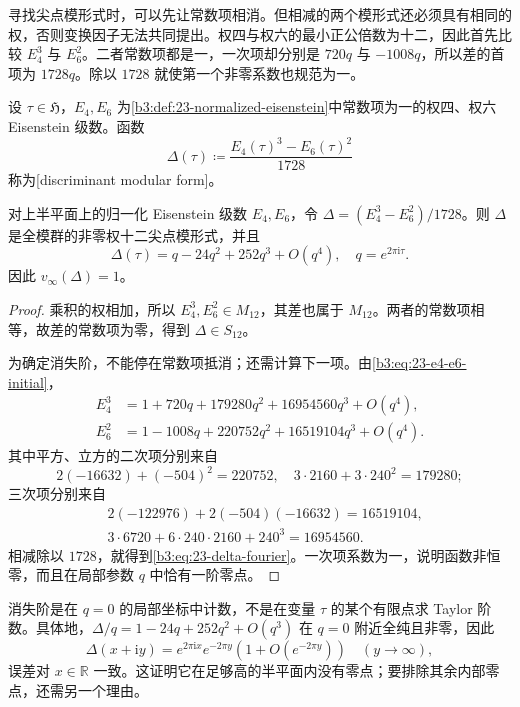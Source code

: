 寻找尖点模形式时，可以先让常数项相消。但相减的两个模形式还必须具有相同的权，否则变换因子无法共同提出。权四与权六的最小正公倍数为十二，因此首先比较 \(E_4^3\) 与 \(E_6^2\)。二者常数项都是一，一次项却分别是 \(720q\) 与 \(-1008q\)，所以差的首项为 \(1728q\)。除以 \(1728\) 就使第一个非零系数也规范为一。

\begin{definition}[判别式模形式]\label{b3:def:23-delta}
设 \(\tau\in\mathfrak H\)，\(E_4,E_6\) 为\cref{b3:def:23-normalized-eisenstein}中常数项为一的权四、权六 Eisenstein 级数。函数
\[
 \Delta(\tau)\coloneqq
 \frac{E_4(\tau)^3-E_6(\tau)^2}{1728}
\]
称为[discriminant modular form]。
\end{definition}

\begin{proposition}[判别式的权与尖点阶数]\label{b3:prop:23-delta-cusp}
对上半平面上的归一化 Eisenstein 级数 \(E_4,E_6\)，令 \(\Delta=(E_4^3-E_6^2)/1728\)。则 \(\Delta\) 是全模群的非零权十二尖点模形式，并且
\begin{equation}\label{b3:eq:23-delta-fourier}
 \Delta(\tau)=q-24q^2+252q^3+O(q^4),
 \quad q=e^{2\pi\mathrm{i}\tau}.
\end{equation}
因此 \(v_\infty(\Delta)=1\)。
\end{proposition}
\begin{proof}
乘积的权相加，所以 \(E_4^3,E_6^2\in M_{12}\)，其差也属于 \(M_{12}\)。两者的常数项相等，故差的常数项为零，得到 \(\Delta\in S_{12}\)。

为确定消失阶，不能停在常数项抵消；还需计算下一项。由\eqref{b3:eq:23-e4-e6-initial}，
\[
 \begin{aligned}
 E_4^3&=1+720q+179280q^2+16954560q^3+O(q^4),\\
 E_6^2&=1-1008q+220752q^2+16519104q^3+O(q^4).
 \end{aligned}
\]
其中平方、立方的二次项分别来自
\[
 2(-16632)+(-504)^2=220752,\quad
 3\cdot2160+3\cdot240^2=179280;
\]
三次项分别来自
\[
 \begin{aligned}
 &2(-122976)+2(-504)(-16632)=16519104,\\
 &3\cdot6720+6\cdot240\cdot2160+240^3=16954560.
 \end{aligned}
\]
相减除以 \(1728\)，就得到\eqref{b3:eq:23-delta-fourier}。一次项系数为一，说明函数非恒零，而且在局部参数 \(q\) 中恰有一阶零点。
\end{proof}

消失阶是在 \(q=0\) 的局部坐标中计数，不是在变量 \(\tau\) 的某个有限点求 Taylor 阶数。具体地，\(\Delta/q=1-24q+252q^2+O(q^3)\) 在 \(q=0\) 附近全纯且非零，因此
\[
 \Delta(x+\mathrm{i}y)
 =e^{2\pi\mathrm{i}x}e^{-2\pi y}
   \left(1+O(e^{-2\pi y})\right)
 \quad(y\longrightarrow\infty),
\]
误差对 \(x\in\mathbb R\) 一致。这证明它在足够高的半平面内没有零点；要排除其余内部零点，还需另一个理由。

